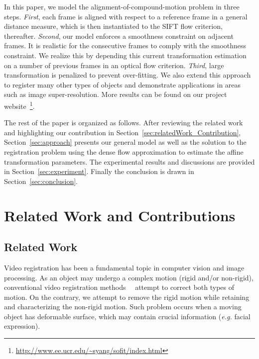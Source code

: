 \documentclass[review]{elsarticle}
\begin{document}
In this paper, we model the alignment-of-compound-motion problem in three steps. \textit{First}, each frame is aligned with respect to a reference frame in a general distance measure, which is then instantiated to the SIFT flow criterion, thereafter. \textit{Second}, our model enforces a smoothness constraint on adjacent frames. It is realistic for the consecutive frames to comply with the smoothness constraint. We realize this by depending this current transformation estimation on a number of previous frames in an optical flow criterion. \textit{Third}, large transformation is penalized to prevent over-fitting. We also extend this approach to register many other types of objects and demonstrate applications in areas such as image super-resolution. More results can be found on our project website~\footnote{\url{http://www.ee.ucr.edu/~syang/sofit/index.html}}.

The rest of the paper is organized as follows. After reviewing the related work and highlighting our contribution in Section~\ref{sec:relatedWork_Contribution}, Section~\ref{sec:approach} presents our general model as well as the solution to the registration problem using the dense flow approximation to estimate the affine transformation parameters. The experimental results and discussions are provided in Section~\ref{sec:experiment}. Finally the conclusion is drawn in Section~\ref{sec:conclusion}.


\section{\label{sec:relatedWork_Contribution}Related Work and Contributions}

\subsection{\label{sec:related_work}Related Work}

Video registration has been a fundamental topic in computer vision and image processing. As an object may undergo a complex motion (rigid and/or non-rigid), conventional video registration methods~\cite{Uenohara95}~\cite{Caspi_PAMI02} attempt to correct both types of motion. On the contrary, we attempt to remove the rigid motion while retaining and characterizing the non-rigid motion. Such problem occurs when a moving object has deformable surface, which may contain crucial information (\textit{e.g.} facial expression).
\end{document}
